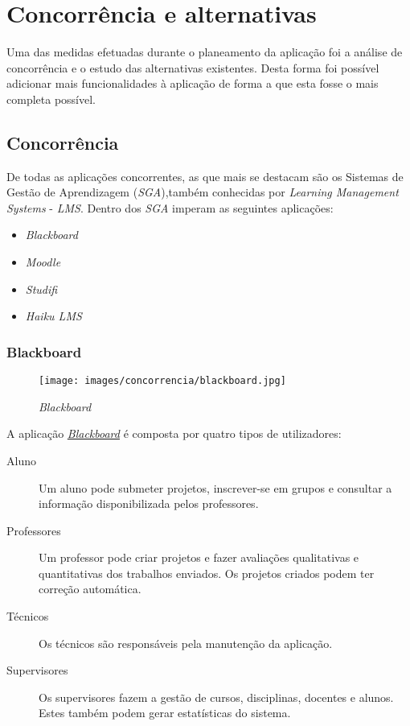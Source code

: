 \section{Concorrência e alternativas}

Uma das medidas efetuadas durante o planeamento da aplicação foi a análise de concorrência e o estudo das alternativas existentes. Desta forma foi possível adicionar mais funcionalidades à aplicação de forma a que esta fosse o mais completa possível.

\subsection{Concorrência} %
\label{sub:concorrencia}

De todas as aplicações concorrentes, as que mais se destacam são os Sistemas de Gestão de Aprendizagem (\emph{SGA}),também conhecidas por \emph{Learning Management Systems} - \emph{LMS}. Dentro dos \emph{SGA} imperam as seguintes aplicações:
\begin{itemize}
	\item \emph{Blackboard}
	\item \emph{Moodle}
	\item \emph{Studifi}
	\item \emph{Haiku LMS}
\end{itemize}

\subsubsection{Blackboard} %
\label{ssub:blackboard}

\begin{figure}[H]
        \centering
        \texttt{[image: images/concorrencia/blackboard.jpg]}
         \caption{\emph{Blackboard}}
         \label{fig: blackboard}
\end{figure}

A aplicação \href{http://www.blackboard.com}{\emph{Blackboard}} é composta por quatro tipos de utilizadores:
\begin{description}
	\item[Aluno] Um aluno pode submeter projetos, inscrever-se em grupos e consultar a informação disponibilizada pelos professores.
	\item[Professores] Um professor pode criar projetos e fazer avaliações qualitativas e quantitativas dos trabalhos enviados. Os projetos criados podem ter correção automática.
	\item[Técnicos] Os técnicos são responsáveis pela manutenção da aplicação.
	\item[Supervisores] Os supervisores fazem a gestão de cursos, disciplinas, docentes e alunos. Estes também podem gerar estatísticas do sistema.
\end{description}

